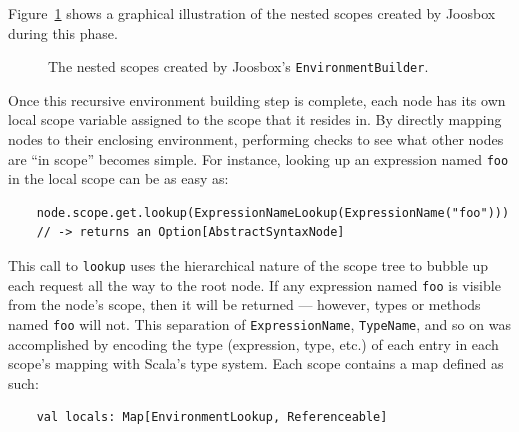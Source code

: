 \documentclass[letterpaper]{article}
\begin{document}
  Figure~\ref{fig:environments} shows a graphical illustration of the nested
  scopes created by Joosbox during this phase.

  \begin{figure}[h!]
    \caption{The nested scopes created by Joosbox's {\tt EnvironmentBuilder}.}
    \centering
    \begin{center}
    \end{center}
    \label{fig:environments}
  \end{figure}

  Once this recursive environment building step is complete, each node has its
  own local scope variable assigned to the scope that it resides in. By
  directly mapping nodes to their enclosing environment, performing checks to
  see what other nodes are ``in scope'' becomes simple. For instance, looking up
  an expression named {\tt foo} in the local scope can be as easy as:

  \begin{verbatim}
    node.scope.get.lookup(ExpressionNameLookup(ExpressionName("foo")))
    // -> returns an Option[AbstractSyntaxNode]
  \end{verbatim}

  This call to {\tt lookup} uses the hierarchical nature of the scope tree
  to bubble up each request all the way to the root node. If any expression
  named {\tt foo} is visible from the node's scope, then it will be returned ---
  however, types or methods named {\tt foo} will not. This separation of
  {\tt ExpressionName}, {\tt TypeName}, and so on was accomplished by
  encoding the type (expression, type, etc.) of each entry in each scope's mapping with
  Scala's type system. Each scope contains a map defined as such:

  \begin{verbatim}
    val locals: Map[EnvironmentLookup, Referenceable]
  \end{verbatim}
\end{document}
